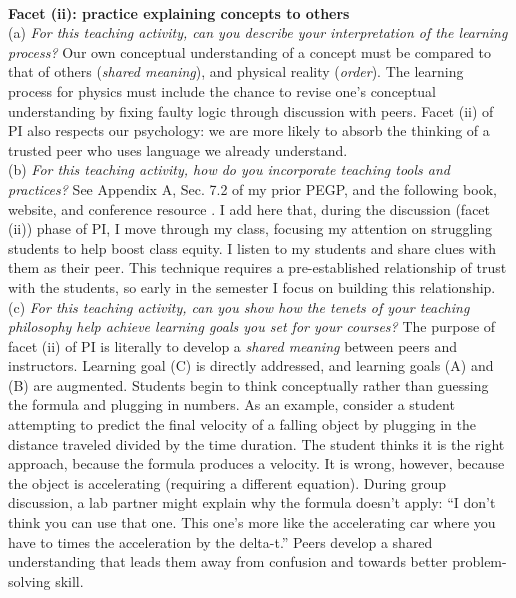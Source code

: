 \documentclass[../../../main.tex]{subfiles}
\begin{document}
\\
\vspace{0.15cm}
\textbf{Facet (ii): practice explaining concepts to others} 
\\
\vspace{0.15cm}
(a) \textit{For this teaching activity, can you describe your interpretation of the learning process?} Our own conceptual understanding of a concept must be compared to that of others (\textit{shared meaning}), and physical reality (\textit{order}).  The learning process for physics must include the chance to revise one's conceptual understanding by fixing faulty logic through discussion with peers.  Facet (ii) of PI also respects our psychology: we are more likely to absorb the thinking of a trusted peer who uses language we already understand.
\\
\vspace{0.15cm}
(b) \textit{For this teaching activity, how do you incorporate teaching tools and practices?}  See Appendix A, Sec. 7.2 of my prior PEGP, and the following book, website, and conference resource \cite{mazur2013peer,PhysPort,AAPTPI}.  I add here that, during the discussion (facet (ii)) phase of PI, I move through my class, focusing my attention on struggling students to help boost class equity.  I listen to my students and share clues with them as their peer.  This technique requires a pre-established relationship of trust with the students, so early in the semester I focus on building this relationship.
\\
\vspace{0.15cm}
(c) \textit{For this teaching activity, can you show how the tenets of your teaching philosophy help achieve learning goals you set for your courses?}  The purpose of facet (ii) of PI is literally to develop a \textit{shared meaning} between peers and instructors.  Learning goal (C) is directly addressed, and learning goals (A) and (B) are augmented.  Students begin to think conceptually rather than guessing the formula and plugging in numbers.  As an example, consider a student attempting to predict the final velocity of a falling object by plugging in the distance traveled divided by the time duration.  The student thinks it is the right approach, because the formula produces a velocity.  It is wrong, however, because the object is accelerating (requiring a different equation).  During group discussion, a lab partner might explain why the formula doesn't apply:  ``I don't think you can use that one. This one's more like the accelerating car where you have to times the acceleration by the delta-t.''  Peers develop a shared understanding that leads them away from confusion and towards better problem-solving skill.
\end{document}
